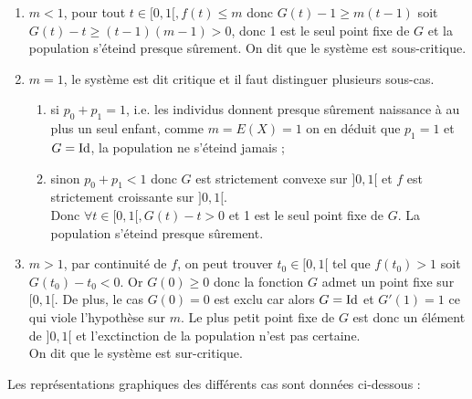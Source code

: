 \begin{enumerate}
\item \textbf{$m<1$}, pour tout $t \in [0,1[, f(t) \leq m$ donc $G(t) - 1 \geq m(t-1)$ 
soit $G(t)-t \geq (t-1)(m-1) > 0$, donc 1 est le seul point fixe de $G$ et la population s'éteind presque sûrement.
On dit que le système est sous-critique. 

\item \textbf{$m=1$}, le système est dit critique et il faut distinguer plusieurs sous-cas.

\begin{enumerate}
\item si $p_0 + p_1 = 1$, i.e. les individus donnent presque sûrement naissance à au plus un seul enfant, comme 
$m = E(X) = 1$ on en déduit que $p_1 = 1$ et $G=\operatorname{Id}$, la population ne s'éteind jamais ;
\item sinon $p_0 + p_1 < 1$ donc $G$ est strictement convexe sur $]0,1[$ et $f$ est strictement croissante sur $]0,1[$. \\
Donc $\forall t \in [0,1[, G(t) - t > 0$ et 1 est le seul point fixe de $G$. La population s'éteind presque sûrement.
\end{enumerate}

\item \textbf{$m>1$}, par continuité de $f$, on peut trouver $t_0 \in [0,1[$ tel que 
$f(t_0) > 1$ soit $G(t_0) - t_0 < 0$. Or $G(0) \geq 0$ donc la fonction $G$ admet un point fixe sur $[0,1[$. 
De plus, le cas $G(0)=0$ est exclu car alors $G = \operatorname{Id}$ et $G'(1) = 1$ ce qui viole l'hypothèse sur $m$. 
Le plus petit point fixe de $G$ est donc un élément de $]0,1[$ et l'exctinction de la population n'est pas certaine. \\
On dit que le système est sur-critique.
\end{enumerate}

Les représentations graphiques des différents cas sont données ci-dessous :

